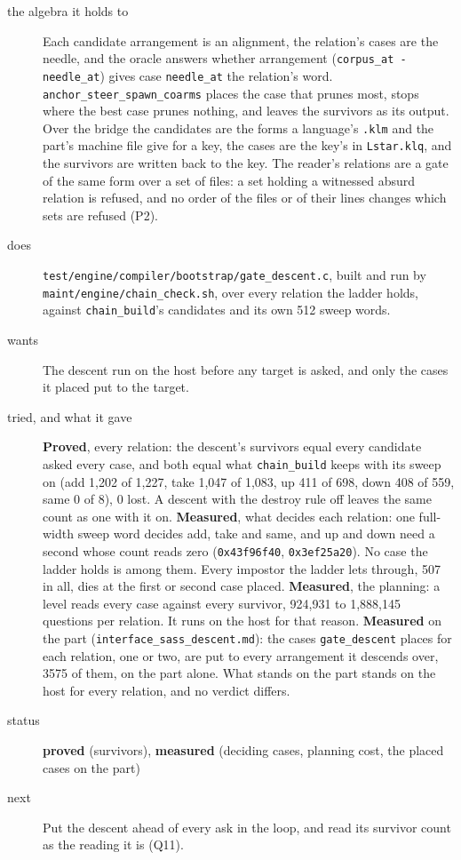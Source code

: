 \begin{description}
\item[{the algebra it holds to}] Each candidate arrangement is an alignment, the relation's cases are the needle, and the oracle answers whether arrangement (\texttt{corpus\_\allowbreak{}at -\allowbreak{} needle\_\allowbreak{}at}) gives case \texttt{needle\_\allowbreak{}at} the relation's word. \texttt{anchor\_\allowbreak{}steer\_\allowbreak{}spawn\_\allowbreak{}coarms} places the case that prunes most, stops where the best case prunes nothing, and leaves the survivors as its output. Over the bridge the candidates are the forms a language's \texttt{.\allowbreak{}klm} and the part's machine file give for a key, the cases are the key's in \texttt{Lstar.\allowbreak{}klq}, and the survivors are written back to the key. The reader's relations are a gate of the same form over a set of files: a set holding a witnessed absurd relation is refused, and no order of the files or of their lines changes which sets are refused (P2).
\item[{does}] \texttt{test/\allowbreak{}engine/\allowbreak{}compiler/\allowbreak{}bootstrap/\allowbreak{}gate\_\allowbreak{}descent.\allowbreak{}c}, built and run by \texttt{maint/\allowbreak{}engine/\allowbreak{}chain\_\allowbreak{}check.\allowbreak{}sh}, over every relation the ladder holds, against \texttt{chain\_\allowbreak{}build}'s candidates and its own 512 sweep words.
\item[{wants}] The descent run on the host before any target is asked, and only the cases it placed put to the target.
\item[{tried, and what it gave}] \textbf{Proved}, every relation: the descent's survivors equal every candidate asked every case, and both equal what \texttt{chain\_\allowbreak{}build} keeps with its sweep on (add 1,202 of 1,227, take 1,047 of 1,083, up 411 of 698, down 408 of 559, same 0 of 8), 0 lost. A descent with the destroy rule off leaves the same count as one with it on. \textbf{Measured}, what decides each relation: one full-width sweep word decides add, take and same, and up and down need a second whose count reads zero (\texttt{0x43f96f40}, \texttt{0x3ef25a20}). No case the ladder holds is among them. Every impostor the ladder lets through, 507 in all, dies at the first or second case placed. \textbf{Measured}, the planning: a level reads every case against every survivor, 924,931 to 1,888,145 questions per relation. It runs on the host for that reason. \textbf{Measured} on the part (\texttt{interface\_\allowbreak{}sass\_\allowbreak{}descent.\allowbreak{}md}): the cases \texttt{gate\_\allowbreak{}descent} places for each relation, one or two, are put to every arrangement it descends over, 3575 of them, on the part alone. What stands on the part stands on the host for every relation, and no verdict differs.
\item[{status}] \textbf{proved} (survivors), \textbf{measured} (deciding cases, planning cost, the placed cases on the part)
\item[{next}] Put the descent ahead of every ask in the loop, and read its survivor count as the reading it is (Q11).
\end{description}

